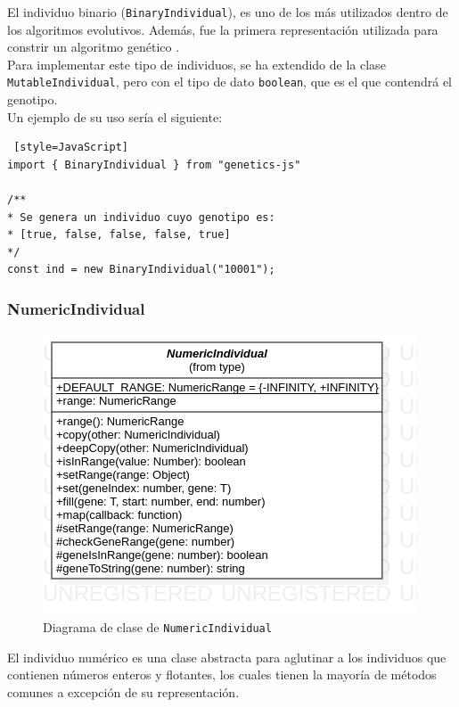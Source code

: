 El individuo binario (\texttt{BinaryIndividual}), es uno de los más utilizados dentro de los algoritmos evolutivos. Además, fue la primera representación utilizada para constrir un algoritmo genético \cite{holland1992adaptation}. \\

Para implementar este tipo de individuos, se ha extendido de la clase \texttt{MutableIndividual}, pero con el tipo de dato \texttt{boolean}, que es el que contendrá el genotipo. \\

Un ejemplo de su uso sería el siguiente: \\

\begin{lstlisting} [style=JavaScript]
import { BinaryIndividual } from "genetics-js"

/**
* Se genera un individuo cuyo genotipo es:
* [true, false, false, false, true]
*/
const ind = new BinaryIndividual("10001");
\end{lstlisting}

\subsubsection{NumericIndividual}

\begin{figure}[H]
    \centering
    \includegraphics[scale=0.6]{mem/images/cap-4/4.2.2(Individuos)/NumericIndividual.png}
    \caption{Diagrama de clase de \texttt{NumericIndividual}}
    \label{fig:binaryindividual-uml}
\end{figure}

El individuo numérico es una clase abstracta para aglutinar a los individuos que contienen números enteros y flotantes, los cuales tienen la mayoría de métodos comunes a excepción de su representación. \\

